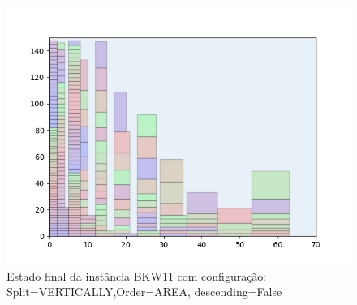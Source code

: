 \begin{figure}[H]
    \centering
    \caption[]{Estado final da instância BKW11 com configuração: Split=VERTICALLY,Order=AREA, descending=False}
    \label{fig:bkw11-vertically-area-false}
    \includegraphics[scale=0.5]{output/figures/bkw/bkw11/vertically/area/false/000}
\end{figure}